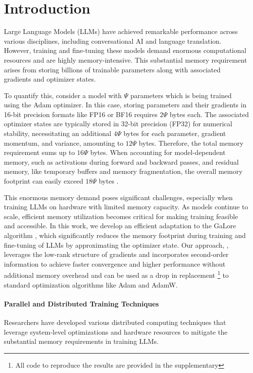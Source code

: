 
\vspace{-8mm}
\section{Introduction}
Large Language Models (LLMs) have achieved remarkable performance across various disciplines, including conversational AI and language translation. However, training and fine-tuning these models demand enormous computational resources and are highly memory-intensive. This substantial memory requirement arises from storing billions of trainable parameters along with associated gradients and optimizer states.

To quantify this, consider a model with $\Psi$ parameters which is being trained using the Adam optimizer. In this case, storing parameters and their gradients in 16-bit precision formats like FP16 or BF16 requires $2\Psi$ bytes each. The associated optimizer states are typically stored in 32-bit precision (FP32) for numerical stability, necessitating an additional $4\Psi$ bytes for each parameter, gradient momentum, and variance, amounting to $12\Psi$ bytes. Therefore, the total memory requirement sums up to $16\Psi$ bytes. When accounting for model-dependent memory, such as activations during forward and backward passes, and residual memory, like temporary buffers and memory fragmentation, the overall memory footprint can easily exceed $18\Psi$ bytes \citep{raffelExploringLimitsTransfer2020,touvronLlamaOpenFoundation2023,chowdheryPaLMScalingLanguage2022}.

This enormous memory demand poses significant challenges, especially when training LLMs on hardware with limited memory capacity. As models continue to scale, efficient memory utilization becomes critical for making training feasible and accessible. In this work, we develop an efficient adaptation to the GaLore algorithm \citep{zhao2024galore}, which significantly reduces the memory footprint during training and fine-tuning of LLMs by approximating the optimizer state. Our approach, \textit{\lowrank}, leverages the low-rank structure of gradients and incorporates second-order information to achieve faster convergence and higher performance without additional memory overhead and can be used as a drop in replacement \footnote[1]{All code to reproduce the results are provided in the supplementary} to standard optimization algorithms like Adam and AdamW.

\paragraph{Parallel and Distributed Training Techniques}
Researchers have developed various distributed computing techniques that leverage system-level optimizations and hardware resources to mitigate the substantial memory requirements in training LLMs.

